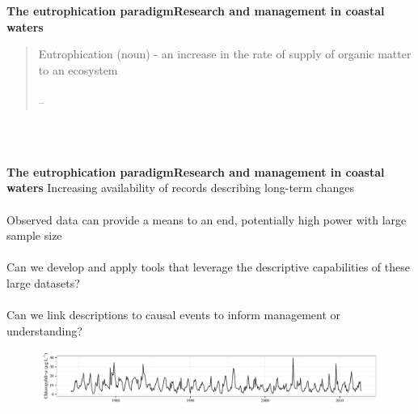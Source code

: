 \documentclass[serif]{beamer}\usepackage[]{graphicx}\usepackage[]{color}
\begin{document}
\begin{frame}{\textbf{The eutrophication paradigm}}{\textbf{Research and management in coastal waters}}
\begin{quote}
Eutrophication (noun) - an \alert{increase} in the rate of supply of \alert{organic matter} to an ecosystem\\~\\
\vspace{0.05in}
\hfill -- \cite{Nixon95}
\end{quote}
\begin{center}
\end{center}
\vspace{-0.5cm}\hspace*{15pt}\\~\\
\end{frame}



\begin{frame}{\textbf{The eutrophication paradigm}}{\textbf{Research and management in coastal waters}}
Increasing availability of records describing \alert{long-term changes} \\~\\
Observed data can provide a means to an end, potentially \alert{high power} with large sample size \\~\\
Can we \alert{develop} and \alert{apply} tools that leverage the descriptive capabilities of these large datasets? \\~\\
Can we \alert{link descriptions} to \alert{causal events} to inform management or understanding?
\begin{figure}
\centerline{\includegraphics[width = \textwidth]{fig/ts_ex.pdf}}
\end{figure}
\end{frame}
\end{document}
